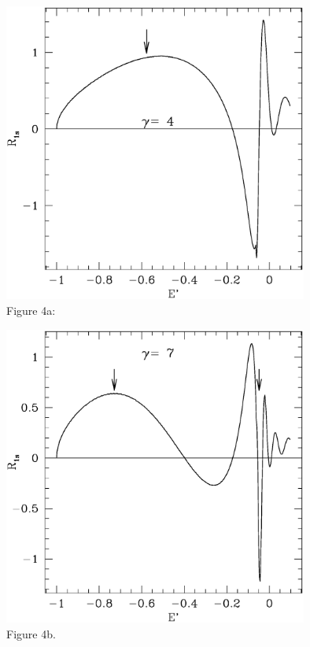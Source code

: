 \documentclass[11pt]{article}
\begin{document}
\begin{center}%
    \includegraphics*[width=10cm]{levelch4.eps} \\%
     Figure 4a:
  \end{center}
\begin{center}%
    \includegraphics*[width=10cm]{levelch7.eps} \\%
     Figure 4b.
  \end{center}
\end{document}
